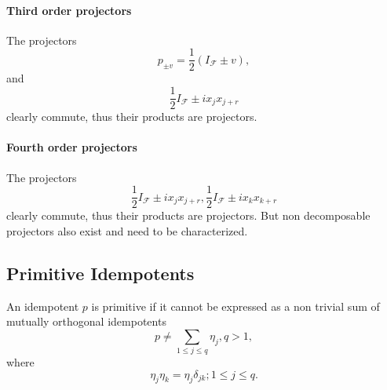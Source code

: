 \documentclass[aps,preprint]{revtex4}%
\begin{document}
\paragraph{Third order projectors}

The projectors
\begin{equation}
p_{\pm v}=\frac{1}{2}\left(  I_{\mathcal{F}}\pm v\right)  ,
\end{equation}
and
\begin{equation}
\frac{1}{2}I_{\mathcal{F}}\pm ix_{j}x_{j+r}%
\end{equation}
clearly commute, thus their products are projectors.

\paragraph{Fourth order projectors}

The projectors
\begin{equation}
\frac{1}{2}I_{\mathcal{F}}\pm ix_{j}x_{j+r},\frac{1}{2}I_{\mathcal{F}}\pm
ix_{k}x_{k+r}%
\end{equation}
clearly commute, thus their products are projectors. But non decomposable
projectors also exist and need to be characterized.

\subsection{Primitive Idempotents}

An idempotent $p$ is primitive if it cannot be expressed as a non trivial sum
of mutually orthogonal idempotents
\begin{equation}
p\neq\sum_{1\leq j\leq q}\eta_{j},q>1,
\end{equation}
where
\begin{equation}
\eta_{j}\eta_{k}=\eta_{j}\delta_{jk};1\leq j\leq q.
\end{equation}
\end{document}
